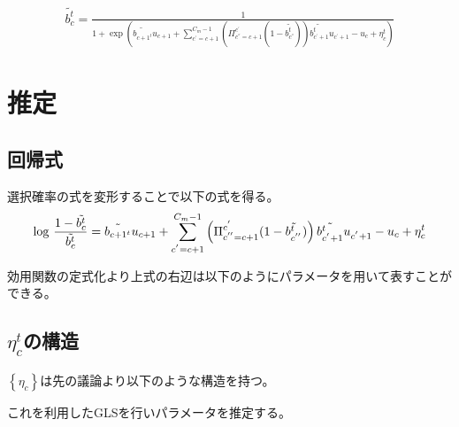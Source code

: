 \documentclass{jsarticle}
\begin{document}
\begin{align*}
	\tilde{b_c^t} = \frac{1}{1 + \exp \left(\tilde{b_{c+1^t}} u_{c+1} + \sum_{c^{'}=c+1}^{C_m-1} \left( \Pi_{c^{''} = c+1}^{c^{'}} (1 - \tilde{b_{c^{''}}^t}) \right) \tilde{b_{c^{'} + 1}^t} u_{c^{'} + 1} - u_c + \eta_c^t \right)}
\end{align*}

\section{推定}
\subsection{回帰式}
選択確率の式を変形することで以下の式を得る。
\begin{align*}
	{\rm log}\ \frac{1 - \tilde{b_c^t}}{\tilde{b_c^t}} = \tilde{b_{c+1^t}} u_{c+1} + \sum_{c^{'}=c+1}^{C_m-1} \left( \Pi_{c^{''} = c+1}^{c^{'}} (1 - \tilde{b_{c^{''}}^t}) \right) \tilde{b_{c^{'} + 1}^t} u_{c^{'} + 1} - u_c + \eta_c^t
\end{align*}

効用関数の定式化より上式の右辺は以下のようにパラメータを用いて表すことができる。

\subsection{$\eta_c^t$の構造}
$\left\{ \eta_c \right\}$は先の議論より以下のような構造を持つ。

これを利用したGLSを行いパラメータを推定する。
\end{document}
